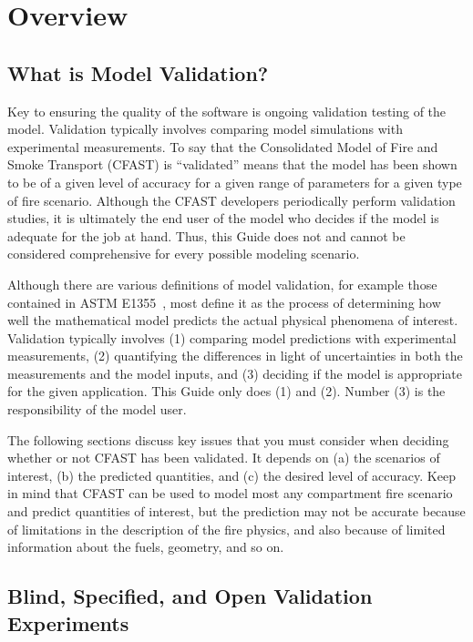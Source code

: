 
\chapter{Overview}



\section{What is Model Validation?}

Key to ensuring the quality of the software is ongoing validation testing of the model. Validation typically involves comparing model simulations with experimental measurements. To say that the Consolidated Model of Fire and Smoke Transport (CFAST) is ``validated'' means that the model has been shown to be of a given level of accuracy for a given range of parameters for a given type of fire scenario. Although the CFAST developers periodically perform validation studies, it is ultimately the end user of the model who decides if the model is adequate for the job at hand. Thus, this Guide does not and cannot be considered comprehensive for every possible modeling scenario.

Although there are various definitions of model validation, for example those contained in ASTM E1355~\cite{CFAST:ASTM:E1355}, most define it as the process of determining how well the mathematical model predicts the actual physical phenomena of interest. Validation typically involves (1) comparing model predictions with experimental measurements, (2) quantifying the differences in light of uncertainties in both the measurements and the model inputs, and (3) deciding if the model is appropriate for the given application. This Guide only does (1) and (2). Number (3) is the responsibility of the model user.

The following sections discuss key issues that you must consider when deciding whether or not CFAST has been validated. It depends on (a) the scenarios of interest, (b) the predicted quantities, and (c) the desired level of accuracy. Keep in mind that CFAST can be used to model most any compartment fire scenario and predict quantities of interest, but the prediction may not be accurate because of limitations in the description of the fire physics, and also because of limited information about the fuels, geometry, and so on.


\section{Blind, Specified, and Open Validation Experiments}

